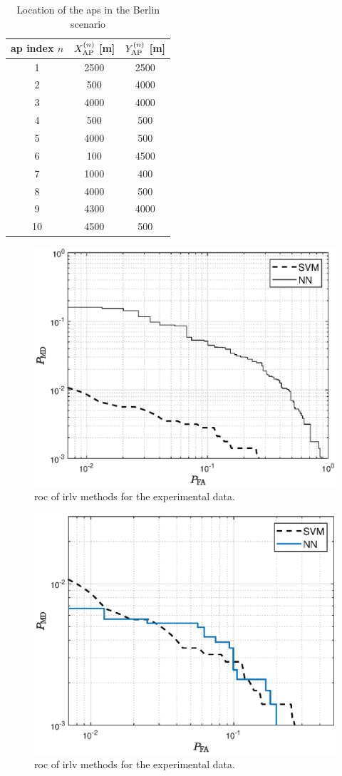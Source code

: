 \documentclass[draftcls,onecolumn,12pt]{IEEEtran}
\begin{document}
\begin{table}
\centering
\caption{Location of the \acp{ap} in the Berlin scenario}
\label{tab:berlin}
\begin{tabular}{c c c}
\toprule
\ac{ap} index $n$ & $X_{\rm AP}^{(n)}$ [m] & $Y_{\rm AP}^{(n)}$ [m] \\
\midrule
1 & 2500 & 2500 \\
2 & 500 & 4000 \\
3 & 4000 & 4000 \\
4 & 500 & 500 \\
5 & 4000 & 500 \\
6 & 100 & 4500 \\
7 & 1000 & 400 \\
8 & 4000 & 500 \\
9 & 4300 & 4000 \\
10 & 4500 & 500 \\
\bottomrule
\end{tabular}
\end{table}

\begin{figure}[t]
    \centering
    \includegraphics[width=0.6\columnwidth]{berlin.eps}
    \caption{\ac{roc} of \ac{irlv} methods for the experimental data.}
    \label{fig:Berlin}
\end{figure}

\begin{figure}[t]
    \centering
    \includegraphics[width=0.6\columnwidth]{berlinNew.eps}
    \caption{\ac{roc} of \ac{irlv} methods for the experimental data.}
    \label{fig:Berlinnew}
\end{figure}
\end{document}

